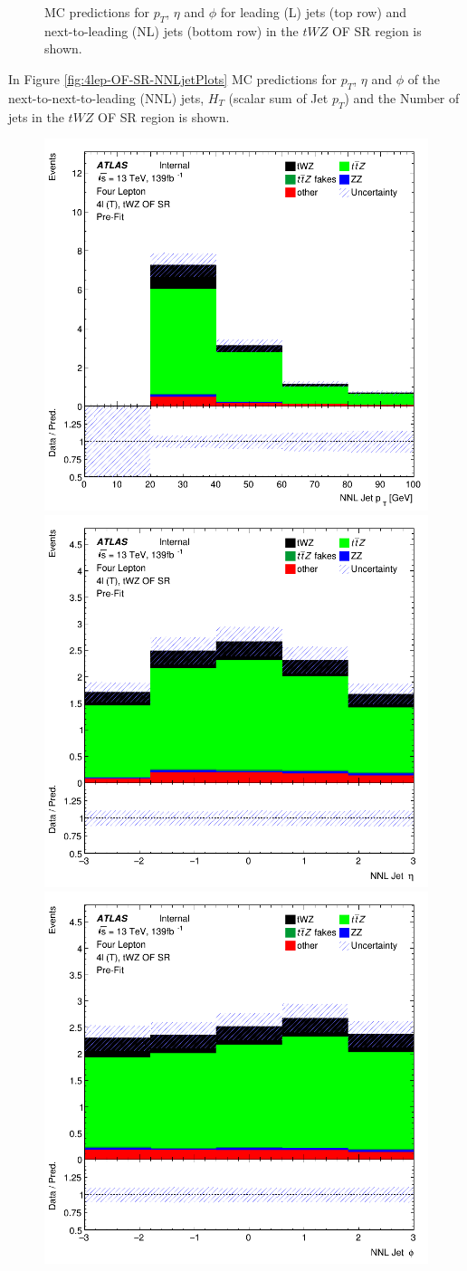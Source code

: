 \begin{figure}[htbp]
\begin{tabular}{ccc}
  \end{tabular}
    \caption{MC predictions for $p_{T}$, $\eta$ and $\phi$ for leading (L) jets (top row) and next-to-leading (NL) jets (bottom row) in the $tWZ$ OF SR region  is shown.}
    \label{fig:4lep-OF-SR-LandNjetPlots} 
\end{figure}

In Figure \ref{fig:4lep-OF-SR-NNLjetPlots} MC predictions for $p_{T}$, $\eta$ and $\phi$ of the next-to-next-to-leading (NNL) jets, $H_{T}$ (scalar sum of Jet $p_{T}$) and the Number of jets in the $tWZ$ OF SR region is shown.


\begin{figure}[htbp]
 \centering


    \includegraphics[width=.3\textwidth]{figures/PreFitPlots/lep4_tWZ_4T_OF_NNLJet_pt.png} \quad
    \includegraphics[width=.3\textwidth]{figures/PreFitPlots/lep4_tWZ_4T_OF_NNLJet_eta.png} \quad
    \includegraphics[width=.3\textwidth]{figures/PreFitPlots/lep4_tWZ_4T_OF_NNLJet_phi.png}

    \medskip


\end{figure}
